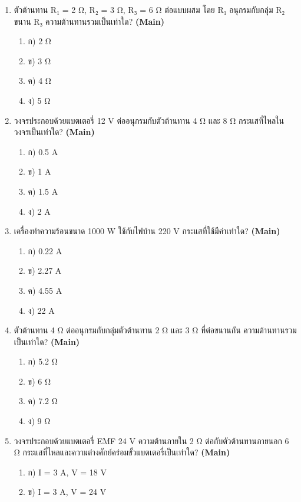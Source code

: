 \documentclass[12pt]{article}
\begin{document}
\begin{enumerate}[label=\arabic*.]
\begin{enumerate}[label=)]
\item ข) 5 Ω
\item ค) 10 Ω
\item ง) 25 Ω
\end{enumerate}
\item ตัวต้านทาน R₁ = 2 Ω, R₂ = 3 Ω, R₃ = 6 Ω ต่อแบบผสม โดย R₁ อนุกรมกับกลุ่ม R₂ ขนาน R₃ ความต้านทานรวมเป็นเท่าใด? \hfill \textbf{\small (Main)}
\begin{enumerate}[label=)]
\item ก) 2 Ω
\item ข) 3 Ω
\item ค) 4 Ω
\item ง) 5 Ω
\end{enumerate}
\item วงจรประกอบด้วยแบตเตอรี่ 12 V ต่ออนุกรมกับตัวต้านทาน 4 Ω และ 8 Ω กระแสที่ไหลในวงจรเป็นเท่าใด? \hfill \textbf{\small (Main)}
\begin{enumerate}[label=)]
\item ก) 0.5 A
\item ข) 1 A
\item ค) 1.5 A
\item ง) 2 A
\end{enumerate}
\item เครื่องทำความร้อนขนาด 1000 W ใช้กับไฟบ้าน 220 V กระแสที่ใช้มีค่าเท่าใด? \hfill \textbf{\small (Main)}
\begin{enumerate}[label=)]
\item ก) 0.22 A
\item ข) 2.27 A
\item ค) 4.55 A
\item ง) 22 A
\end{enumerate}
\item ตัวต้านทาน 4 Ω ต่ออนุกรมกับกลุ่มตัวต้านทาน 2 Ω และ 3 Ω ที่ต่อขนานกัน ความต้านทานรวมเป็นเท่าใด? \hfill \textbf{\small (Main)}
\begin{enumerate}[label=)]
\item ก) 5.2 Ω
\item ข) 6 Ω
\item ค) 7.2 Ω
\item ง) 9 Ω
\end{enumerate}
\item วงจรประกอบด้วยแบตเตอรี่ EMF 24 V ความต้านภายใน 2 Ω ต่อกับตัวต้านทานภายนอก 6 Ω กระแสที่ไหลและความต่างศักย์คร่อมขั้วแบตเตอรี่เป็นเท่าใด? \hfill \textbf{\small (Main)}
\begin{enumerate}[label=)]
\item ก) I = 3 A, V = 18 V
\item ข) I = 3 A, V = 24 V

\end{enumerate}
\end{enumerate}
\end{document}
